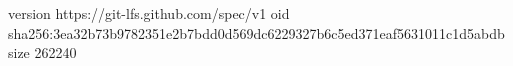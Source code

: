version https://git-lfs.github.com/spec/v1
oid sha256:3ea32b73b9782351e2b7bdd0d569dc6229327b6c5ed371eaf5631011c1d5abdb
size 262240
